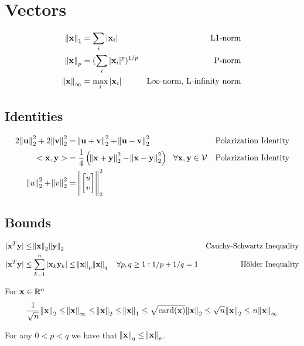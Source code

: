 \section{Vectors}

\begin{align}
\norm{\vx}_1      &= \sum_i |\vx_i|           & \textrm{L1-norm\index{L1-norm}} \\
\norm{\vx}_p      &= (\sum_i |\vx_i|^p)^{1/p} & \textrm{P-norm\index{P-norm}}   \\
\norm{\vx}_\infty &= \max_i |\vx_i|           & \textrm{L$\infty$-norm\index{L$\infty$-norm}, L-infinity norm}
\end{align}

\subsection{Identities}

\begin{align}
2\norm{\mathbf{u}}_2^2+2\norm{\mathbf{v}}_2^2 &= \norm{\mathbf{u}+\mathbf{v}}_2^2 + \norm{\mathbf{u}-\mathbf{v}}_2^2                                                      & \textrm{Polarization Identity} \\
<\mathbf{x},\mathbf{y}>                       &= \frac{1}{4}\left(\norm{\mathbf{x}+\mathbf{y}}_2^2-\norm{\mathbf{x}-\mathbf{y}}_2^2\right)~~\forall \mathbf{x},\mathbf{y}\in\mathcal{V} & \textrm{Polarization Identity} \\
\norm{u}_2^2+\norm{v}_2^2&=\norm{\begin{bmatrix} u \\ v\end{bmatrix}}_2^2
\end{align}


\subsection{Bounds}

\begin{align}
|\mathbf{x}^T \mathbf{y}| &\le \norm{\mathbf{x}}_2 \norm{\mathbf{y}}_2 & \textrm{Cauchy-Schwartz Inequality} \\
|\mathbf{x}^T \mathbf{y}| &\le \sum_{k=1}^n |\mathbf{x}_k \mathbf{y}_k| \le \norm{\mathbf{x}}_p \norm{\mathbf{x}}_q~~~\forall p,q\ge1: 1/p+1/q=1 & \textrm{H\"older Inequality}
\end{align}

For $\mathbf{x}\in\mathbb{R}^n$
\begin{equation}
\frac{1}{\sqrt{n}}\norm{\mathbf{x}}_2
\le\norm{\mathbf{x}}_\infty
\le\norm{\mathbf{x}}_2
\le\norm{\mathbf{x}}_1
\le\sqrt{\textrm{card}(\mathbf{x})}\norm{\mathbf{x}}_2
\le\sqrt{n}\norm{\mathbf{x}}_2
\le n \norm{\mathbf{x}}_\infty
\end{equation}

For any $0<p<q$ we have that $\norm{\mathbf{x}}_q\le\norm{\mathbf{x}}_p$.